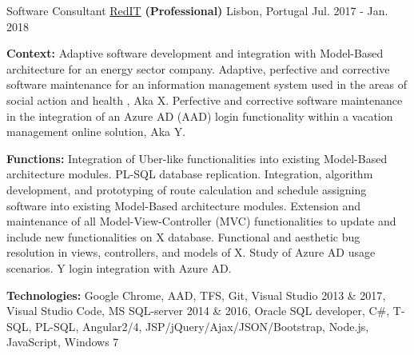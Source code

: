 \begin{cventries}
  \cventry
    {Software Consultant} %
    {\href{https://www.reditpro.com/}{RedIT} \textbf{(Professional)}} %
    {Lisbon, Portugal} %
    {Jul. 2017 - Jan. 2018} 
    {
      \begin{cvitems} %
		\item[] {\textbf{Context:} 
Adaptive software development and integration with Model-Based architecture for an energy sector company. %
Adaptive, perfective and corrective software maintenance for an information management system used in the areas of social action and health%
, Aka X.
Perfective and corrective software maintenance in the integration of an Azure AD (AAD) login functionality within a vacation management online solution, Aka Y.}
		\item[] {\textbf{Functions:} Integration of Uber-like functionalities into existing Model-Based architecture modules. PL-SQL database replication. Integration, algorithm development, and prototyping of route calculation and schedule assigning software into existing Model-Based architecture modules.
		Extension and maintenance of all Model-View-Controller (MVC) functionalities to update and include new functionalities on X database. Functional and aesthetic bug resolution in views, controllers, and models of X.
		Study of Azure AD usage scenarios. Y login integration with Azure AD.}		
		\item[] {\textbf{Technologies:} 
		\textcolor{rainbowcolor-olive}{Google Chrome}, 
		\textcolor{rainbowcolor-olive}{AAD}, 
		\textcolor{rainbowcolor-olive}{TFS}, 
		\textcolor{rainbowcolor-olive}{Git}, 
		\textcolor{rainbowcolor-olive}{Visual Studio 2013 \& 2017},
		\textcolor{rainbowcolor-olive}{Visual Studio Code}, 
		\textcolor{rainbowcolor-olive}{MS SQL-server 2014 \& 2016},
		\textcolor{rainbowcolor-olive}{Oracle SQL developer},
		\textcolor{rainbowcolor-indigo}{C\#}, 
		\textcolor{rainbowcolor-indigo}{T-SQL},
		\textcolor{rainbowcolor-indigo}{PL-SQL}, 
		\textcolor{rainbowcolor-indigo}{Angular2/4}, 
		\textcolor{rainbowcolor-indigo}{JSP/jQuery/Ajax/JSON/Bootstrap},
		\textcolor{rainbowcolor-indigo}{Node.js}, 
		\textcolor{rainbowcolor-indigo}{JavaScript}, 
		\textcolor{rainbowcolor-orange}{Windows 7}}	
      \end{cvitems}
    } 
    

\end{cventries}
